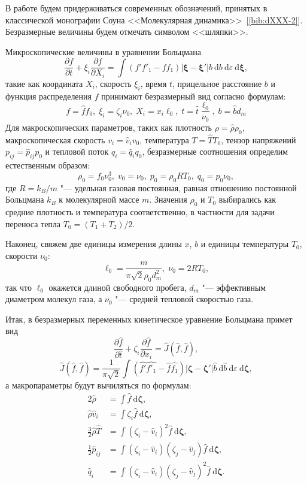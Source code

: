 \documentclass[english,russian,a4paper,12pt]{article}
\newcommand{\dd}{\:\mathrm{d}}
\begin{document}
В работе будем придерживаться современных обозначений, принятых 
в классической монографии Соуна <<Молекулярная динамика>>~[\ref{bib:dXXX-2}].
Безразмерные величины будем отмечать символом <<шляпки>>.

Микроскопические величины в уравнении Больцмана
\[
	\frac{\partial{f}}{\partial{t}} + \xi_i\frac{\partial{f}}{\partial X_i} = 
	\int (f'f'_1-ff_1)|\boldsymbol{\xi}-\boldsymbol{\xi}'|b\dd b \dd \varepsilon \boldsymbol{\dd\xi},
\]
такие как координата \(X_i\), скорость \(\xi_i\), время \(t\), прицельное расстояние \(b\)
и функция распределения \(f\) принимают безразмерный вид согласно формулам:
\[ f = \hat{f}f_0,\; \xi_i = \zeta_i\nu_0,\; X_i = x_i\ell_0,\;
	t = \hat{t}\frac{\ell_0}{\nu_0},\; b = \hat{b}d_m \]
Для макроскопических параметров, таких как плотность \( \rho = \hat{\rho}\rho_0\), макроскопическая скорость \(v_i = \hat{v}_iv_0\),
температура \(T = \hat{T}T_0\), тензор напряжений \(p_{ij} = \hat{p}_{ij}p_0\) и тепловой поток \(q_i = \hat{q}_iq_0\), 
безразмерные соотношения определим естественным образом:
\[ \rho_0 = f_0 \nu_0^3, \; v_0 = \nu_0, \; p_0 = \rho_0RT_0, \; q_0 = p_0\nu_0, \]
где \(R = k_B/m\) "--- удельная газовая постоянная, равная отношению постоянной Больцмана \(k_B\) к молекулярной массе \(m\).
Значения \(\rho_0\) и \(T_0\) выбирались как средние плотность и температура соответственно,
в частности для задачи переноса тепла \(T_0 = (T_1+T_2)/2\).

Наконец, свяжем две единицы измерения длины \(x\), \(b\) и единицы температуры \(T_0\), скорости \(\nu_0\):
\[ \ell_0 = \frac{m}{\pi\sqrt2 \rho_0 d_m^2}, \; \nu_0 = 2RT_0, \]
так что \(\ell_0\) окажется длиной свободного пробега, \(d_m\) "--- эффективным диаметром молекул газа,
а \(\nu_0\) "--- средней тепловой скоростью газа.

Итак, в безразмерных переменных кинетическое уравнение Больцмана примет вид
\[ \frac{\partial\hat{f}}{\partial\hat{t}} + \zeta_i\frac{\partial\hat{f}}{\partial x_i} = \hat{J}(\hat{f},\hat{f}), \]
\[ 
	\hat{J}(\hat{f},\hat{f}) = \frac1{\pi\sqrt2}\int (\hat{f'}\hat{f'_1}-\hat{f}\hat{f_1})
	|\boldsymbol{\zeta}-\boldsymbol{\zeta}'| \hat{b}\dd \hat{b} \dd \varepsilon \boldsymbol{\dd\zeta},
\]
а макропараметры будут вычиляться по формулам:
\begin{alignat*}{2}
	\hat{\rho} &= \int \hat{f}\boldsymbol{\dd\zeta}, \\
	\hat{\rho}\hat{v}_i &= \int \zeta_i \hat{f}\boldsymbol{\dd\zeta}, \\
	\frac3{2}\hat{\rho}\hat{T} &= \int(\zeta_i-\hat{v}_i)^2\hat{f}\boldsymbol{\dd\zeta}, \\
	\frac1{2}\hat{p}_{ij} &= \int(\zeta_i-\hat{v}_i)(\zeta_j-\hat{v}_j)\hat{f}\boldsymbol{\dd\zeta}, \\
	\hat{q}_i &= \int(\zeta_i-\hat{v}_i)(\zeta_j-\hat{v}_j)^2\hat{f}\boldsymbol{\dd\zeta}.
\end{alignat*}
\end{document}
